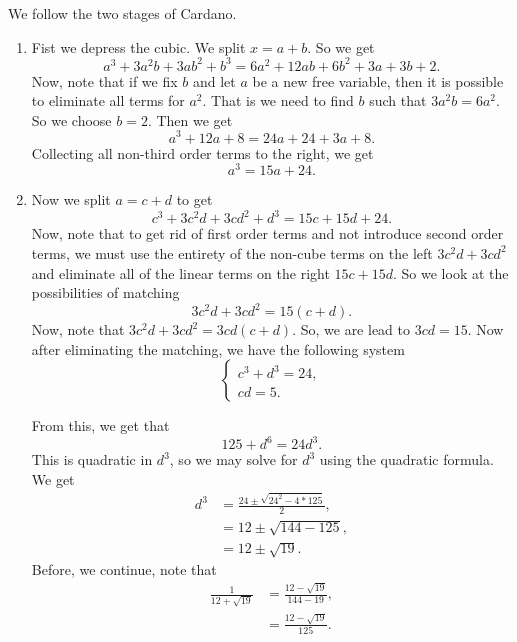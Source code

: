We follow the two stages of Cardano.

\begin{enumerate}
\item Fist we depress the cubic. We split \(x = a + b\). So we get
\begin{equation}
a^3 + 3a^2b + 3 ab^2 + b^3 = 6a^2 + 12 ab + 6b^2 + 3a + 3b + 2.
\end{equation}
Now, note that if we fix \(b\) and let \(a\) be a new free variable, then it is possible to eliminate all
terms for \(a^2\). That is we need to find \(b\) such that \(3a^2b = 6a^2\). So we choose \(b = 2\). Then
we get
\begin{equation}
a^3 + 12a + 8 = 24a + 24 + 3a + 8.
\end{equation}
Collecting all non-third order terms to the right, we get
\begin{equation}
a^3 = 15a + 24.
\end{equation}

\item Now we split \(a = c + d\) to get
\begin{equation}
c^3 + 3c^2d + 3cd^2 + d^3 = 15c + 15d + 24. 
\end{equation}
Now, note that to get rid of first order terms and not introduce second order terms, we must use the entirety of the
non-cube terms on the left \(3c^2d + 3cd^2\) and eliminate all of the linear terms on the right \(15c + 15d\).
So we look at the possibilities of matching
\begin{equation}
3c^2d + 3cd^2 = 15(c + d).
\end{equation}
Now, note that \(3c^2d + 3cd^2 = 3cd(c + d)\). So, we are lead to \(3cd = 15\). Now after eliminating the matching, we
have the following system
\begin{equation}
\begin{cases}
c^3 + d^3 = 24, \\
cd = 5.
\end{cases}
\end{equation}

From this, we get that
\begin{equation}
125 + d^6 = 24d^3.
\end{equation}
This is quadratic in \(d^3\), so we may solve for \(d^3\) using the quadratic formula. We get
\begin{align}
d^3 & = \frac{24 \pm \sqrt{24^2 - 4 * 125}}{2}, \\ 
& = 12 \pm \sqrt{144 - 125}, \\ 
& = 12 \pm \sqrt{19}.
\end{align} 
Before, we continue, note that
\begin{align}
\frac{1}{12 + \sqrt{19}} & = \frac{12 - \sqrt{19}}{144 - 19}, \\
    & = \frac{12 - \sqrt{19}}{125}. 
\end{align}


\end{enumerate}
